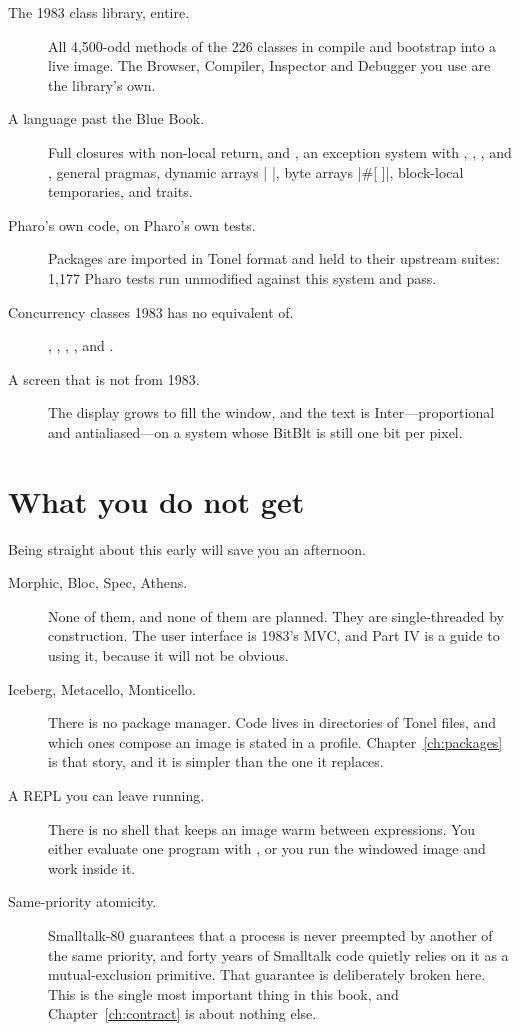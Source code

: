 \begin{description}
\item[The 1983 class library, entire.] All 4{,}500-odd methods of the 226
  classes in  compile and bootstrap into a live image. The
  Browser, Compiler, Inspector and Debugger you use are the library's own.
\item[A language past the Blue Book.] Full closures with non-local return,
   and , an exception system with ,
  , ,  and , general pragmas,
  dynamic arrays \ct|{ }|, byte arrays \ct|#[ ]|, block-local temporaries, and
  traits.
\item[Pharo's own code, on Pharo's own tests.] Packages are imported in Tonel
  format and held to their upstream suites: 1{,}177 Pharo tests run unmodified
  against this system and pass.
\item[Concurrency classes 1983 has no equivalent of.] ,
  , , , and
  .
\item[A screen that is not from 1983.] The display grows to fill the window,
  and the text is Inter---proportional and antialiased---on a system whose
  BitBlt is still one bit per pixel.
\end{description}

\section{What you do not get}

Being straight about this early will save you an afternoon.

\begin{description}
\item[Morphic, Bloc, Spec, Athens.] None of them, and none of them are
  planned. They are single-threaded by construction. The user interface is
  1983's MVC, and Part IV is a guide to using it, because it will not be
  obvious.
\item[Iceberg, Metacello, Monticello.] There is no package manager. Code
  lives in directories of Tonel files, and which ones compose an image is
  stated in a profile. Chapter~\ref{ch:packages} is that story, and it is
  simpler than the one it replaces.
\item[A REPL you can leave running.] There is no  shell that keeps
  an image warm between expressions. You either evaluate one program with
  , or you run the windowed image and work inside it.
\item[Same-priority atomicity.] Smalltalk-80 guarantees that a process is
  never preempted by another of the same priority, and forty years of
  Smalltalk code quietly relies on it as a mutual-exclusion primitive. That
  guarantee is deliberately broken here. This is the single most important
  thing in this book, and Chapter~\ref{ch:contract} is about nothing else.
\end{description}

